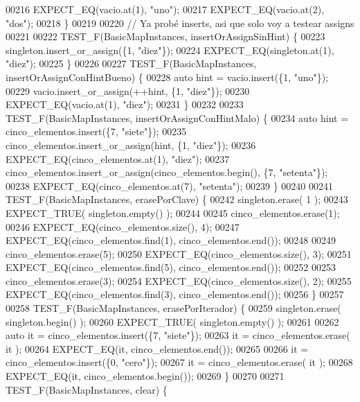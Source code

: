 \begin{DoxyCode}
00216     EXPECT\_EQ(vacio.at(1), \textcolor{stringliteral}{"uno"});
00217     EXPECT\_EQ(vacio.at(2), \textcolor{stringliteral}{"dos"});
00218 \}
00219 
00220 \textcolor{comment}{// Ya probé inserts, asi que solo voy a testear assigns}
00221 
00222 TEST\_F(BasicMapInstances, insertOrAssignSinHint) \{
00223     singleton.insert\_or\_assign(\{1, \textcolor{stringliteral}{"diez"}\});
00224     EXPECT\_EQ(singleton.at(1), \textcolor{stringliteral}{"diez"});
00225 \}
00226 
00227 TEST\_F(BasicMapInstances, insertOrAssignConHintBueno) \{
00228     \textcolor{keyword}{auto} hint = vacio.insert(\{1, \textcolor{stringliteral}{"uno"}\});
00229     vacio.insert\_or\_assign(++hint, \{1, \textcolor{stringliteral}{"diez"}\});
00230     EXPECT\_EQ(vacio.at(1), \textcolor{stringliteral}{"diez"});
00231 \}
00232 
00233 TEST\_F(BasicMapInstances, insertOrAssignConHintMalo) \{
00234     \textcolor{keyword}{auto} hint = cinco\_elementos.insert(\{7, \textcolor{stringliteral}{"siete"}\});
00235     cinco\_elementos.insert\_or\_assign(hint, \{1, \textcolor{stringliteral}{"diez"}\});
00236     EXPECT\_EQ(cinco\_elementos.at(1), \textcolor{stringliteral}{"diez"});
00237     cinco\_elementos.insert\_or\_assign(cinco\_elementos.begin(), \{7, \textcolor{stringliteral}{"setenta"}\});
00238     EXPECT\_EQ(cinco\_elementos.at(7), \textcolor{stringliteral}{"setenta"});
00239 \}
00240 
00241 TEST\_F(BasicMapInstances, erasePorClave) \{
00242     singleton.erase( 1 );
00243     EXPECT\_TRUE( singleton.empty() );
00244 
00245     cinco\_elementos.erase(1);
00246     EXPECT\_EQ(cinco\_elementos.size(), 4);
00247     EXPECT\_EQ(cinco\_elementos.find(1), cinco\_elementos.end());
00248 
00249     cinco\_elementos.erase(5);
00250     EXPECT\_EQ(cinco\_elementos.size(), 3);
00251     EXPECT\_EQ(cinco\_elementos.find(5), cinco\_elementos.end());
00252 
00253     cinco\_elementos.erase(3);
00254     EXPECT\_EQ(cinco\_elementos.size(), 2);
00255     EXPECT\_EQ(cinco\_elementos.find(3), cinco\_elementos.end());
00256 \}
00257 
00258 TEST\_F(BasicMapInstances, erasePorIterador) \{
00259     singleton.erase( singleton.begin() );
00260     EXPECT\_TRUE( singleton.empty() );
00261 
00262     \textcolor{keyword}{auto} it = cinco\_elementos.insert(\{7, \textcolor{stringliteral}{"siete"}\});
00263     it = cinco\_elementos.erase( it );
00264     EXPECT\_EQ(it, cinco\_elementos.end());
00265 
00266     it = cinco\_elementos.insert(\{0, \textcolor{stringliteral}{"cero"}\});
00267     it = cinco\_elementos.erase( it );
00268     EXPECT\_EQ(it, cinco\_elementos.begin());
00269 \}
00270 
00271 TEST\_F(BasicMapInstances, clear) \{

\end{DoxyCode}
